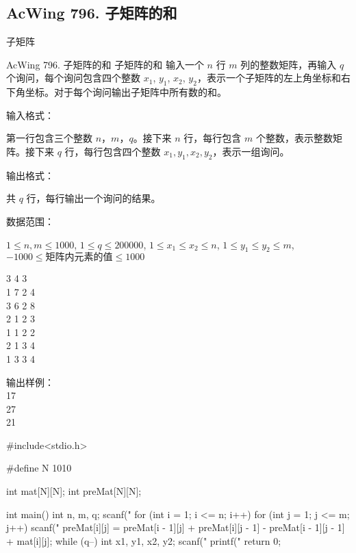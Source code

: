 \subsection{AcWing 796. 子矩阵的和}
子矩阵
\begin{problembox}{AcWing 796. 子矩阵的和}
    \small{子矩阵的和}
    输入一个 $n$ 行 $m$ 列的整数矩阵，再输入 $q$ 个询问，每个询问包含四个整数 $x_1$, $y_1$, $x_2$, $y_2$，表示一个子矩阵的左上角坐标和右下角坐标。对于每个询问输出子矩阵中所有数的和。

    输入格式：

    第一行包含三个整数 $n$，$m$，$q$。接下来 $n$ 行，每行包含 $m$ 个整数，表示整数矩阵。接下来 $q$ 行，每行包含四个整数 $x_1, y_1, x_2, y_2$，表示一组询问。

    输出格式：

    共 $q$ 行，每行输出一个询问的结果。

    数据范围：

    $1 \le n,m \le 1000$,
    $1 \le q \le 200000$,
    $1 \le x_1 \le x_2 \le n$,
    $1 \le y_1 \le y_2 \le m$,
    $-1000 \le 矩阵内元素的值 \le 1000$

    \begin{inputblock}
        3 4 3 \\
        1 7 2 4 \\
        3 6 2 8 \\
        2 1 2 3 \\
        1 1 2 2 \\
        2 1 3 4\\
        1 3 3 4
    \end{inputblock}%
    \begin{minipage}[t]{.5\textwidth}
        输出样例：\\
        17 \\
        27 \\
        21
    \end{minipage}
\end{problembox}

\begin{mycpponecol}[子矩阵的和]
    #include<stdio.h>

    #define N 1010

    int mat[N][N];
    int preMat[N][N];

    int main() {
        int n, m, q;
        scanf("%
        for (int i = 1; i <= n; i++) {
            for (int j = 1; j <= m; j++) {
                scanf("%
                preMat[i][j] = preMat[i - 1][j] + preMat[i][j - 1] - preMat[i - 1][j - 1] + mat[i][j];
            }
        }
        while (q--) {
            int x1, y1, x2, y2;
            scanf("%
            printf("%
        }
        return 0;
    }
\end{mycpponecol}

